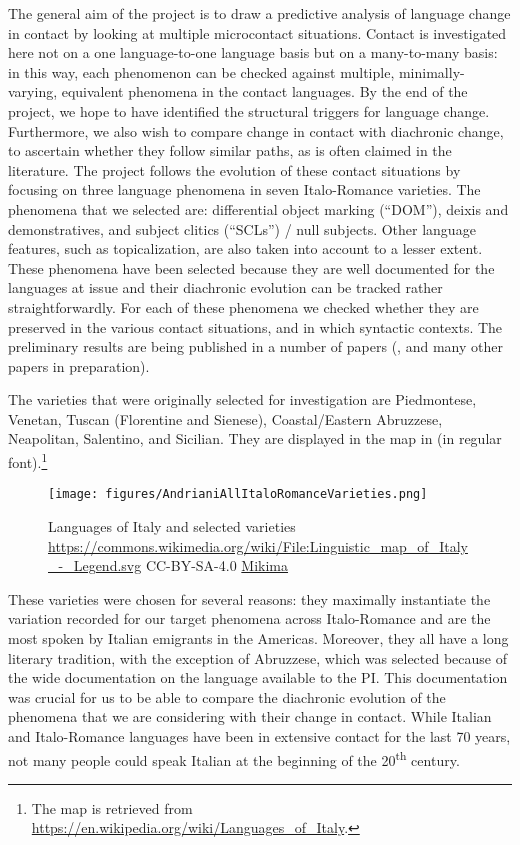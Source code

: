 \documentclass[output=paper,hidelinks]{langscibook}
\begin{document}
The general aim of the project is to draw a predictive analysis of language change in contact by looking at multiple microcontact situations. Contact is investigated here not on a one language-to-one language basis but on a many-to-many basis: in this way, each phenomenon can be checked against multiple, minimally-varying, equivalent phenomena in the contact languages. By the end of the project, we hope to have identified the structural triggers for language change. Furthermore, we also wish to compare change in contact with diachronic change, to ascertain whether they follow similar paths, as is often claimed in the literature. The project follows the evolution of these contact situations by focusing on three language phenomena in seven Italo-Romance varieties. The phenomena that we selected are: differential object marking (``DOM''), deixis and demonstratives, and subject clitics (``SCLs'') / null subjects. Other language features, such as topicalization, are also taken into account to a lesser extent. These phenomena have been selected because they are well documented for the languages at issue and their diachronic evolution can be tracked rather straightforwardly. For each of these phenomena we checked whether they are preserved in the various contact situations, and in which syntactic contexts. The preliminary results are being published in a number of papers (\citealt{AndrianiEtAl2020, CasalicchioFrasson2019, Sorgini2020, Terenghi2020, DAlessandro2021, FrassonIP, FrassonEtAlIP}, and many other papers in preparation).

The varieties that were originally selected for investigation are Piedmontese, Venetan, Tuscan (Florentine and Sienese), Coastal/Eastern Abruzzese, Neapolitan, Salentino, and Sicilian. They are displayed in the map in  (in regular font).\footnote{The map is retrieved from \url{https://en.wikipedia.org/wiki/Languages\_of\_Italy}.}

\begin{figure}
\caption{Languages of Italy and selected varieties\\\tiny \url{https://commons.wikimedia.org/wiki/File:Linguistic_map_of_Italy_-_Legend.svg} CC-BY-SA-4.0 \href{https://commons.wikimedia.org/wiki/User:Mikima}{Mikima}}
\texttt{[image: figures/AndrianiAllItaloRomanceVarieties.png]}
\label{fig:map}
\end{figure}

These varieties were chosen for several reasons: they maximally instantiate the variation recorded for our target phenomena across Italo-Romance and are the most spoken by Italian emigrants in the Americas. Moreover, they all have a long literary tradition, with the exception of Abruzzese, which was selected because of the wide documentation on the language available to the PI. This documentation was crucial for us to be able to compare the diachronic evolution of the phenomena that we are considering with their change in contact. While Italian and Italo-Romance languages have been in extensive contact for the last 70 years, not many people could speak Italian at the beginning of the 20\textsuperscript{th} century. 
\end{document}
